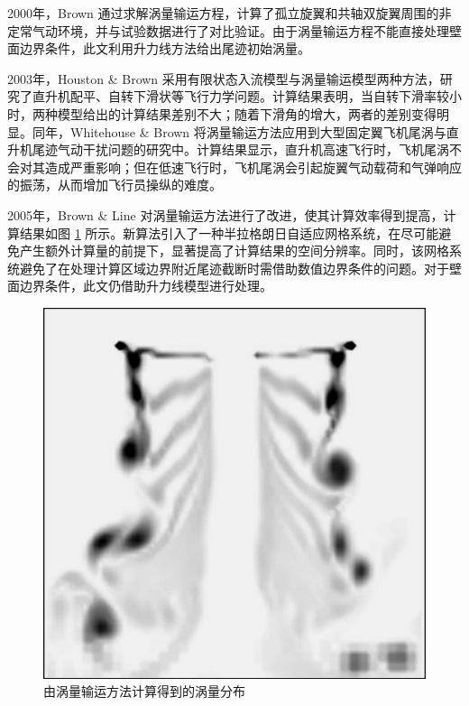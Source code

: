 2000年，Brown 通过求解涡量输运方程，计算了孤立旋翼和共轴双旋翼周围的非定常气动环境，并与试验数据进行了对比验证。由于涡量输运方程不能直接处理壁面边界条件，此文利用升力线方法给出尾迹初始涡量。

2003年，Houston \& Brown 采用有限状态入流模型与涡量输运模型两种方法，研究了直升机配平、自转下滑状等飞行力学问题。计算结果表明，当自转下滑率较小时，两种模型给出的计算结果差别不大；随着下滑角的增大，两者的差别变得明显。同年，Whitehouse
\& Brown 将涡量输运方法应用到大型固定翼飞机尾涡与直升机尾迹气动干扰问题的研究中。计算结果显示，直升机高速飞行时，飞机尾涡不会对其造成严重影响；但在低速飞行时，飞机尾涡会引起旋翼气动载荷和气弹响应的振荡，从而增加飞行员操纵的难度。

2005年，Brown \& Line 对涡量输运方法进行了改进，使其计算效率得到提高，计算结果如图
\ref{fig:VTM} 所示。新算法引入了一种半拉格朗日自适应网格系统，在尽可能避免产生额外计算量的前提下，显著提高了计算结果的空间分辨率。同时，该网格系统避免了在处理计算区域边界附近尾迹截断时需借助数值边界条件的问题。对于壁面边界条件，此文仍借助升力线模型进行处理。
\begin{figure}[h!]
\centering{}\includegraphics[width=1\textwidth,height=0.26\textheight,keepaspectratio]{../review/figures/vtm}
\caption{\label{fig:VTM}由涡量输运方法计算得到的涡量分布}
\end{figure}


